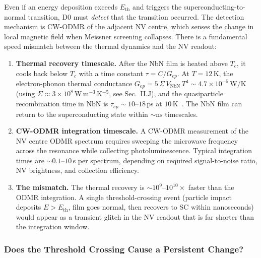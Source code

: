 Even if an energy deposition exceeds $E_\mathrm{th}$ and triggers the
superconducting-to-normal transition, D0 must \emph{detect} that the
transition occurred. The detection mechanism is CW-ODMR of the adjacent NV
centre, which senses the change in local magnetic field when Meissner
screening collapses. There is a fundamental speed mismatch between the
thermal dynamics and the NV readout:

\begin{enumerate}
  \item \textbf{Thermal recovery timescale.}
    After the NbN film is heated above $T_c$, it cools back below $T_c$
    with a time constant $\tau = C/G_{ep}$. At $T = 12$\,K, the
    electron-phonon thermal conductance
    $G_{ep} = 5\,\Sigma\,V_\mathrm{NbN}\,T^4 \sim
    4.7 \times 10^{-5}$\,W/K (using
    $\Sigma \approx 3 \times 10^8$\,W\,m$^{-3}$\,K$^{-5}$, see
    \cite{Richards1994} Sec.~II.J),
    and the quasiparticle recombination time in NbN is
    $\tau_{ep} \sim 10$--$18$\,ps at
    $10$\,K~\cite{Sidorova2020}. %
    The NbN film can return to the superconducting state within
    $\sim\!\mathrm{ns}$ timescales.

  \item \textbf{CW-ODMR integration timescale.}
    A CW-ODMR measurement of the NV centre ODMR spectrum requires sweeping
    the microwave frequency across the resonance while collecting
    photoluminescence. Typical integration times are
    $\sim 0.1$--$10$\,s per spectrum, depending on required
    signal-to-noise ratio, NV brightness, and collection
    efficiency.

  \item \textbf{The mismatch.}
    The thermal recovery is $\sim 10^{9}$--$10^{10}\times$ faster than the
    ODMR integration. A single threshold-crossing event (particle impact
    deposits $E > E_\mathrm{th}$, film goes normal, then recovers to SC
    within nanoseconds) would appear as a transient glitch in the NV readout
    that is far shorter than the integration window.
\end{enumerate}

\subsubsection{Does the Threshold Crossing Cause a Persistent Change?}

